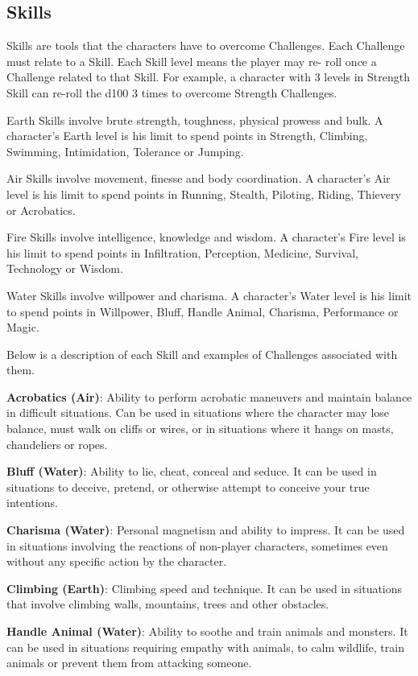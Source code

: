 \begin{multicols}{2}
\subsection{Skills}
Skills are tools that the characters have to
overcome Challenges. Each Challenge must relate
to a Skill. Each Skill level means the player may re-
roll once a Challenge related to that Skill. For
example, a character with 3 levels in Strength Skill
can re-roll the d100 3 times to overcome Strength
Challenges.

Earth Skills involve brute strength,
toughness, physical prowess and bulk. A
character's Earth level is his limit to spend
points in Strength, Climbing, Swimming,
Intimidation, Tolerance or Jumping.

Air Skills involve movement, finesse and
body coordination. A character's Air level is
his limit to spend points in Running, Stealth,
Piloting, Riding, Thievery or Acrobatics.

Fire Skills involve intelligence, knowledge
and wisdom. A character's Fire level is his
limit to spend points in Infiltration,
Perception, Medicine, Survival, Technology
or Wisdom.

Water Skills involve willpower and
charisma. A character's Water level is his
limit to spend points in Willpower, Bluff,
Handle Animal, Charisma, Performance or
Magic.

Below is a description of each Skill and
examples of Challenges associated with them.

\textbf{Acrobatics (Air)}: Ability to perform
acrobatic maneuvers and maintain balance in
difficult situations. Can be used in situations
where the character may lose balance, must walk
on cliffs or wires, or in situations where it hangs
on masts, chandeliers or ropes.

\textbf{Bluff (Water)}: Ability to lie, cheat, conceal
and seduce. It can be used in situations to deceive,
pretend, or otherwise attempt to conceive your
true intentions.

\textbf{Charisma (Water)}: Personal magnetism
and ability to impress. It can be used in situations
involving the reactions of non-player characters,
sometimes even without any specific action by the
character.

\textbf{Climbing (Earth)}: Climbing speed and
technique. It can be used in situations that involve
climbing walls, mountains, trees and other
obstacles.

\textbf{Handle Animal (Water)}: Ability to soothe
and train animals and monsters. It can be used in
situations requiring empathy with animals, to
calm wildlife, train animals or prevent them from
attacking someone.


\end{multicols}
